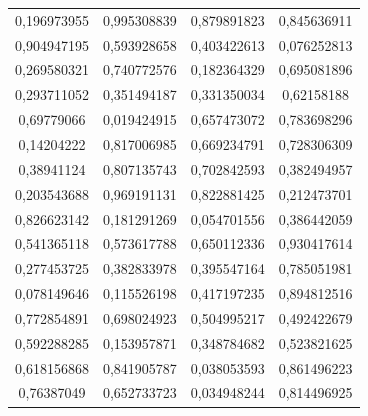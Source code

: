 \documentclass[a4paper,12pt]{article}
\begin{document}
\begin{longtable}{|c|c|c|c|}
0,196973955 & 0,995308839 & 0,879891823 & 0,845636911 \\
0,904947195 & 0,593928658 & 0,403422613 & 0,076252813 \\
0,269580321 & 0,740772576 & 0,182364329 & 0,695081896 \\
0,293711052 & 0,351494187 & 0,331350034 & 0,62158188 \\
0,69779066 & 0,019424915 & 0,657473072 & 0,783698296 \\
0,14204222 & 0,817006985 & 0,669234791 & 0,728306309 \\
0,38941124 & 0,807135743 & 0,702842593 & 0,382494957 \\
0,203543688 & 0,969191131 & 0,822881425 & 0,212473701 \\
0,826623142 & 0,181291269 & 0,054701556 & 0,386442059 \\
0,541365118 & 0,573617788 & 0,650112336 & 0,930417614 \\
0,277453725 & 0,382833978 & 0,395547164 & 0,785051981 \\
0,078149646 & 0,115526198 & 0,417197235 & 0,894812516 \\
0,772854891 & 0,698024923 & 0,504995217 & 0,492422679 \\
0,592288285 & 0,153957871 & 0,348784682 & 0,523821625 \\
0,618156868 & 0,841905787 & 0,038053593 & 0,861496223 \\
0,76387049 & 0,652733723 & 0,034948244 & 0,814496925 \\
\end{longtable}


\listoffigures

\listoftables
\end{document}
